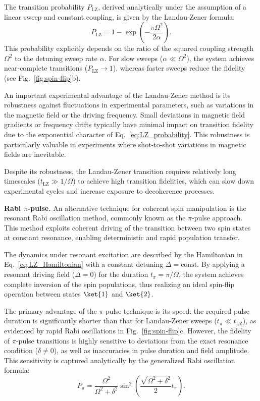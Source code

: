 The transition probability $P_{\text{LZ}}$, derived analytically under the assumption of a linear sweep and constant coupling, is given by the Landau-Zener formula:
\begin{equation}
P_{\text{LZ}} = 1 - \exp\left(-\frac{\pi \Omega^2}{2\alpha}\right).
\label{eq:LZ_probability}
\end{equation}
This probability explicitly depends on the ratio of the squared coupling strength $\Omega^2$ to the detuning sweep rate $\alpha$. For slow sweeps ($\alpha \ll \Omega^2$), the system achieves near-complete transitions ($P_{\text{LZ}}\rightarrow1$), whereas faster sweeps reduce the fidelity (see Fig.~\ref{fig:spin-flip}b).

An important experimental advantage of the Landau-Zener method is its robustness against fluctuations in experimental parameters, such as variations in the magnetic field or the driving frequency. Small deviations in magnetic field gradients or frequency drifts typically have minimal impact on transition fidelity due to the exponential character of Eq.~\eqref{eq:LZ_probability}. This robustness is particularly valuable in experiments where shot-to-shot variations in magnetic fields are inevitable.

Despite its robustness, the Landau-Zener transition requires relatively long timescales ($t_{\text{LZ}} \gg 1/\Omega$) to achieve high transition fidelities, which can slow down experimental cycles and increase exposure to decoherence processes.

\textbf{Rabi $\pi$-pulse.}
An alternative technique for coherent spin manipulation is the resonant Rabi oscillation method, commonly known as the $\pi$-pulse approach. This method exploits coherent driving of the transition between two spin states at constant resonance, enabling deterministic and rapid population transfer.

The dynamics under resonant excitation are described by the Hamiltonian in Eq.~\eqref{eq:LZ_Hamiltonian} with a constant detuning $\Delta=\text{const}$. By applying a resonant driving field ($\Delta=0$) for the duration $t_\pi = \pi/\Omega$, the system achieves complete inversion of the spin populations, thus realizing an ideal spin-flip operation between states $\ket{1}$ and $\ket{2}$.

The primary advantage of the $\pi$-pulse technique is its speed: the required pulse duration is significantly shorter than that for Landau-Zener sweeps ($t_\pi \ll t_{\text{LZ}}$), as evidenced by rapid Rabi oscillations in Fig.~\ref{fig:spin-flip}c. However, the fidelity of $\pi$-pulse transitions is highly sensitive to deviations from the exact resonance condition ($\delta \neq 0$), as well as inaccuracies in pulse duration and field amplitude. This sensitivity is captured analytically by the generalized Rabi oscillation formula:
\begin{equation}
P_{\pi} = \frac{\Omega^2}{\Omega^2+\delta^2}\sin^2\left(\frac{\sqrt{\Omega^2+\delta^2}}{2}t_{\pi}\right).
\label{eq:pi_fidelity}
\end{equation}

